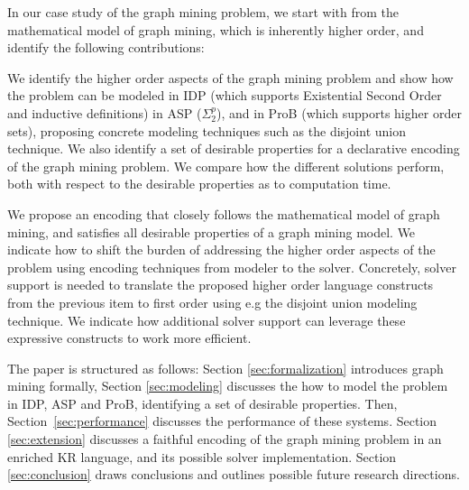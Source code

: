 In our case study of the graph mining problem, we start with from the mathematical model of graph mining, which is inherently higher order, and identify the following contributions:
\begin{compactitem}
\item We identify the higher order aspects of the graph mining problem and show how the problem can be modeled in IDP (which supports Existential Second Order and inductive definitions) in ASP ($\Sigma_{2}^{p}$), and in ProB (which supports higher order sets), proposing concrete modeling techniques such as the disjoint union technique. 
We also identify a set of desirable properties for a declarative encoding of the graph mining problem.
We compare how the different solutions perform, both with respect to the desirable properties as to computation time.
\item We propose an encoding that closely follows the mathematical model of graph mining, and satisfies all desirable properties of a graph mining model.
We indicate how to shift the burden of addressing the higher order aspects of the problem using encoding techniques from modeler to the solver. 
Concretely, solver support is needed to translate the proposed higher order language constructs from the previous item to first order using e.g the disjoint union modeling technique.
We indicate how additional solver support can leverage these expressive constructs to work more efficient.
\end{compactitem}
The paper is structured as follows: Section \ref{sec:formalization} introduces graph mining formally, Section \ref{sec:modeling} discusses the how to model the problem in IDP, ASP and ProB, identifying a set of desirable properties.
Then, Section~\ref{sec:performance} discusses the performance of these systems.
Section \ref{sec:extension} discusses a faithful encoding of the graph mining problem in an enriched KR language, and its possible solver implementation. Section \ref{sec:conclusion} draws conclusions and outlines possible future research directions.
